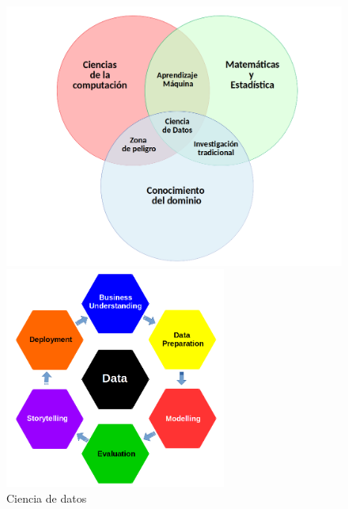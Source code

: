 \documentclass[
  letterpaper,
  DIV=11,
  numbers=noendperiod]{scrreprt}
\begin{document}
\begin{figure}

\begin{minipage}[b]{0.50\linewidth}

{\centering 

\includegraphics{datascience1.png}

}

\end{minipage}%
%
\begin{minipage}[b]{0.50\linewidth}

{\centering 

\includegraphics[width=2.86458in,height=\textheight]{datascience_english.png}

}

\end{minipage}%

\caption{\label{fig-ds}Ciencia de datos}

\end{figure}
\end{document}
